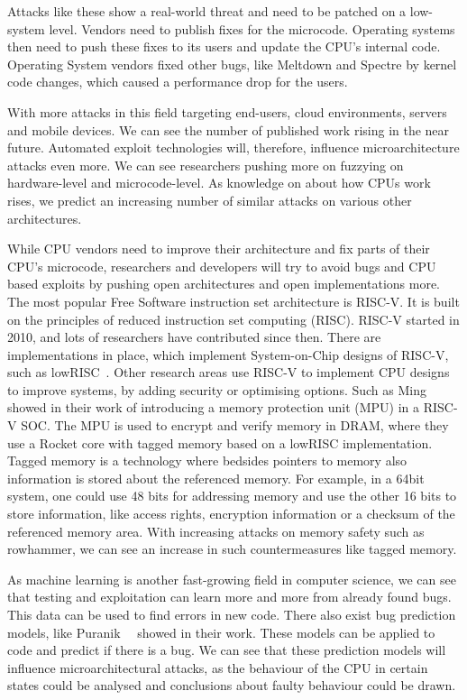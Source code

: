 Attacks like these show a real-world threat and need to be patched on a
low-system level. Vendors need to publish fixes for the microcode. Operating
systems then need to push these fixes to its users and update the CPU's internal
code. Operating System vendors fixed other bugs, like Meltdown and Spectre by
kernel code changes, which caused a performance drop for the users.

With more attacks in this field targeting end-users, cloud environments, servers
and mobile devices. We can see the number of published work rising in the near
future. Automated exploit technologies will, therefore, influence
microarchitecture attacks even more. We can see researchers pushing more on
fuzzying on hardware-level and microcode-level. As knowledge on about how CPUs
work rises, we predict an increasing number of similar attacks on various other
architectures.

While CPU vendors need to improve their architecture and fix parts of their
CPU's microcode, researchers and developers will try to avoid bugs and CPU based
exploits by pushing open architectures and open implementations more. The most
popular Free Software instruction set architecture is RISC-V. It is built on the
principles of reduced instruction set computing (RISC). RISC-V started in 2010,
and lots of researchers have contributed since then. There are implementations
in place, which implement System-on-Chip designs of RISC-V, such as
lowRISC~\cite{lowrisc}. Other research areas use RISC-V  to implement CPU
designs to improve systems, by adding security or optimising options. Such as
Ming~\etal~\cite{smarts} showed in their work of introducing a memory protection
unit (MPU) in a RISC-V SOC. The MPU is used to encrypt and verify memory in
DRAM, where they use a Rocket core with tagged memory based on a lowRISC
implementation. Tagged memory is a technology where bedsides pointers to memory
also information is stored about the referenced memory. For example, in a 64bit
system, one could use 48 bits for addressing memory and use the other 16 bits to
store information, like access rights, encryption information or a checksum of
the referenced memory area. With increasing attacks on memory safety such as
rowhammer, we can see an increase in such countermeasures like tagged memory.

As machine learning is another fast-growing field in computer science, we can
see that testing and exploitation can learn more and more from already found
bugs. This data can be used to find errors in new code. There also exist bug
prediction models, like Puranik~\etal~\cite{bugprediction} showed in their work.
These models can be applied to code and predict if there is a bug. We can see
that these prediction models will influence microarchitectural attacks, as the
behaviour of the CPU in certain states could be analysed and conclusions about
faulty behaviour could be drawn.

